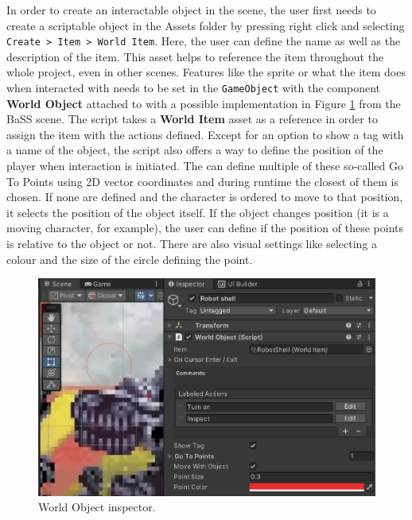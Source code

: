 In order to create an interactable object in the scene, the user first needs to create a scriptable object in the Assets folder by pressing right click and selecting \verb|Create > Item > World Item|. Here, the user can define the name as well as the description of the item. This asset helps to reference the item throughout the whole project, even in other scenes. Features like the sprite or what the item does when interacted with needs to be set in the \verb|GameObject| with the component \textbf{World Object} attached to with a possible implementation in Figure \ref{fig:Manual-WO} from the BaSS scene. The script takes a \textbf{World Item} asset as a reference in order to assign the item with the actions defined. Except for an option to show a tag with a name of the object, the script also offers a way to define the position of the player when interaction is initiated. The can define multiple of these so-called Go To Points using 2D vector coordinates and during runtime the closest of them is chosen. If none are defined and the character is ordered to move to that position, it selects the position of the object itself. If the object changes position (it is a moving character, for example), the user can define if the position of these points is relative to the object or not. There are also visual settings like selecting a colour and the size of the circle defining the point.
\begin{figure}[H]
\centering
\includegraphics[width=.8\linewidth]{img/User doc/world_object.png}
\caption{World Object inspector.}
\label{fig:Manual-WO}
\end{figure}

